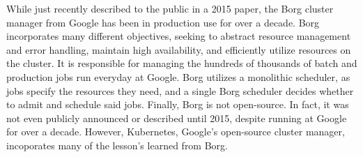 While just recently described to the public in a 2015 paper, the
Borg cluster manager from Google has been in production use for over a
decade.\cite[pg. 14]{borg} Borg incorporates
many different objectives, seeking to abstract resource management and error
handling, maintain high availability, and efficiently utilize resources on the
cluster.\cite[pg. 1]{borg} It is responsible for managing the hundreds of
thousands of batch and production jobs run everyday at Google.
Borg utilizes a monolithic scheduler, as jobs specify the
resources they need, and a single Borg scheduler decides whether to admit and
schedule said jobs. Finally, Borg is not open-source. In fact, it was not even
publicly announced or described until 2015, despite running at Google for over a
decade. However, Kubernetes, Google's open-source cluster manager, incoporates
many of the lesson's learned from Borg.\cite[pg. 12]{borg}
